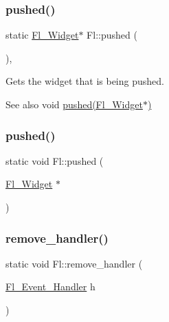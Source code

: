 \subsubsection{\texorpdfstring{pushed()}{pushed()}\hspace{0.1cm}{\footnotesize\ttfamily [1/2]}}
{\footnotesize\ttfamily static \hyperlink{class_fl___widget}{Fl\+\_\+\+Widget}$\ast$ Fl\+::pushed (\begin{DoxyParamCaption}{ }\end{DoxyParamCaption})\hspace{0.3cm}{\ttfamily [inline]}, {\ttfamily [static]}}

Gets the widget that is being pushed. \begin{DoxySeeAlso}{See also}
void \hyperlink{group__fl__events_ga6354e26494fadf24cbeadb61af57ffe1}{pushed(\+Fl\+\_\+\+Widget$\ast$)} 
\end{DoxySeeAlso}
\mbox{\label{group__fl__events_ga6354e26494fadf24cbeadb61af57ffe1}} 
\subsubsection{\texorpdfstring{pushed()}{pushed()}\hspace{0.1cm}{\footnotesize\ttfamily [2/2]}}
{\footnotesize\ttfamily static void Fl\+::pushed (\begin{DoxyParamCaption}\item[{\hyperlink{class_fl___widget}{Fl\+\_\+\+Widget} $\ast$}]{ }\end{DoxyParamCaption})\hspace{0.3cm}{\ttfamily [static]}}

\mbox{\label{group__fl__events_ga1e4ab0d2521ad7b51a03378d4e09e476}} 
\subsubsection{\texorpdfstring{remove\+\_\+handler()}{remove\_handler()}}
{\footnotesize\ttfamily static void Fl\+::remove\+\_\+handler (\begin{DoxyParamCaption}\item[{\hyperlink{group__callback__functions_ga188f6b1dd8e78ccc91c013fe5c6bba74}{Fl\+\_\+\+Event\+\_\+\+Handler}}]{h }\end{DoxyParamCaption})\hspace{0.3cm}{\ttfamily [static]}}

